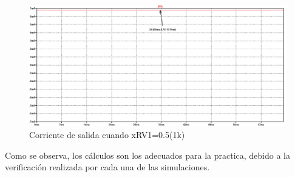 \begin{enumerate}
\begin{enumerate}
\begin{itemize}
                            \begin{figure}[H]
                                \centering
                                \renewcommand{\figurename}{Gráfica}
                                \includegraphics[width=15cm]{Imagenes/sim_fuente_corriente_variable_corrx05.png}
                                \caption{Corriente de salida cuando  xRV1=0.5(1k)}
                                \label{fig:sim_fuente_corriente_variable_corrx05}
                            \end{figure}

                            
                    \end{itemize}
            \end{enumerate}
        
    \end{enumerate}
    
    Como se observa, los cálculos son los adecuados para la practica, debido a la verificación realizada por cada una de las simulaciones.
\newpage

